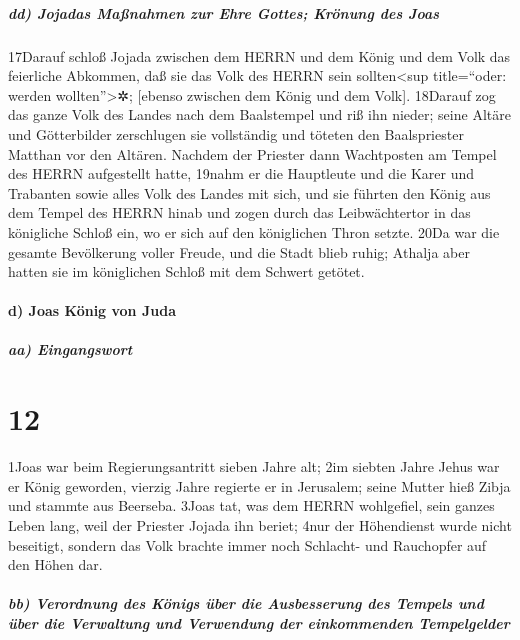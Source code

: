 \hypertarget{dd-jojadas-mauxdfnahmen-zur-ehre-gottes-kruxf6nung-des-joas}{%
\subparagraph{dd) Jojadas Maßnahmen zur Ehre Gottes; Krönung des
Joas}\label{dd-jojadas-mauxdfnahmen-zur-ehre-gottes-kruxf6nung-des-joas}}

17Darauf schloß Jojada zwischen dem HERRN und dem König und dem Volk das
feierliche Abkommen, daß sie das Volk des HERRN sein
sollten\textless sup title=``oder: werden wollten''\textgreater✲;
{[}ebenso zwischen dem König und dem Volk{]}. 18Darauf zog das ganze
Volk des Landes nach dem Baalstempel und riß ihn nieder; seine Altäre
und Götterbilder zerschlugen sie vollständig und töteten den
Baalspriester Matthan vor den Altären. Nachdem der Priester dann
Wachtposten am Tempel des HERRN aufgestellt hatte, 19nahm er die
Hauptleute und die Karer und Trabanten sowie alles Volk des Landes mit
sich, und sie führten den König aus dem Tempel des HERRN hinab und zogen
durch das Leibwächtertor in das königliche Schloß ein, wo er sich auf
den königlichen Thron setzte. 20Da war die gesamte Bevölkerung voller
Freude, und die Stadt blieb ruhig; Athalja aber hatten sie im
königlichen Schloß mit dem Schwert getötet.

\hypertarget{d-joas-kuxf6nig-von-juda}{%
\paragraph{d) Joas König von Juda}\label{d-joas-kuxf6nig-von-juda}}

\hypertarget{aa-eingangswort}{%
\subparagraph{aa) Eingangswort}\label{aa-eingangswort}}

\hypertarget{section-11}{%
\section{12}\label{section-11}}

1Joas war beim Regierungsantritt sieben Jahre alt; 2im siebten Jahre
Jehus war er König geworden, vierzig Jahre regierte er in Jerusalem;
seine Mutter hieß Zibja und stammte aus Beerseba. 3Joas tat, was dem
HERRN wohlgefiel, sein ganzes Leben lang, weil der Priester Jojada ihn
beriet; 4nur der Höhendienst wurde nicht beseitigt, sondern das Volk
brachte immer noch Schlacht- und Rauchopfer auf den Höhen dar.

\hypertarget{bb-verordnung-des-kuxf6nigs-uxfcber-die-ausbesserung-des-tempels-und-uxfcber-die-verwaltung-und-verwendung-der-einkommenden-tempelgelder}{%
\subparagraph{bb) Verordnung des Königs über die Ausbesserung des
Tempels und über die Verwaltung und Verwendung der einkommenden
Tempelgelder}\label{bb-verordnung-des-kuxf6nigs-uxfcber-die-ausbesserung-des-tempels-und-uxfcber-die-verwaltung-und-verwendung-der-einkommenden-tempelgelder}}

